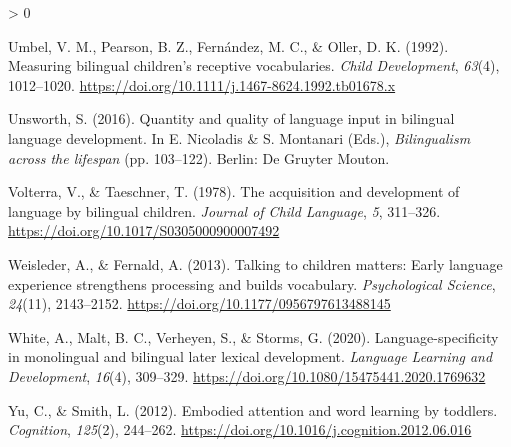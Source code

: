 \documentclass[
  english,
  ,man,floatsintext]{apa6}
\newlength{\cslhangindent}
\newenvironment{CSLReferences}[2] %
 {%
  \setlength{\parindent}{0pt}
  \ifodd #1 \everypar{\setlength{\hangindent}{\cslhangindent}}\ignorespaces\fi
  \ifnum #2 > 0
  \setlength{\parskip}{#2\baselineskip}
  \fi
 }%
 {}
\begin{document}
\begin{CSLReferences}{1}{0}
\leavevmode\hypertarget{ref-Umbel_etal_1992}{}%
Umbel, V. M., Pearson, B. Z., Fernández, M. C., \& Oller, D. K. (1992). Measuring bilingual children's receptive vocabularies. \emph{Child Development}, \emph{63}(4), 1012--1020. \url{https://doi.org/10.1111/j.1467-8624.1992.tb01678.x}

\leavevmode\hypertarget{ref-Unsworth_2016}{}%
Unsworth, S. (2016). Quantity and quality of language input in bilingual language development. In E. Nicoladis \& S. Montanari (Eds.), \emph{Bilingualism across the lifespan} (pp. 103--122). Berlin: De Gruyter Mouton.

\leavevmode\hypertarget{ref-Volterra_Taeschner_1978}{}%
Volterra, V., \& Taeschner, T. (1978). The acquisition and development of language by bilingual children. \emph{Journal of Child Language}, \emph{5}, 311--326. \url{https://doi.org/10.1017/S0305000900007492}

\leavevmode\hypertarget{ref-Weisleder_Fernald_2013}{}%
Weisleder, A., \& Fernald, A. (2013). Talking to children matters: Early language experience strengthens processing and builds vocabulary. \emph{Psychological Science}, \emph{24}(11), 2143--2152. \url{https://doi.org/10.1177/0956797613488145}

\leavevmode\hypertarget{ref-White_etal_2020}{}%
White, A., Malt, B. C., Verheyen, S., \& Storms, G. (2020). Language-specificity in monolingual and bilingual later lexical development. \emph{Language Learning and Development}, \emph{16}(4), 309--329. \url{https://doi.org/10.1080/15475441.2020.1769632}

\leavevmode\hypertarget{ref-Yu_Smith_2012}{}%
Yu, C., \& Smith, L. (2012). Embodied attention and word learning by toddlers. \emph{Cognition}, \emph{125}(2), 244--262. \url{https://doi.org/10.1016/j.cognition.2012.06.016}

\end{CSLReferences}

\endgroup
\end{document}
